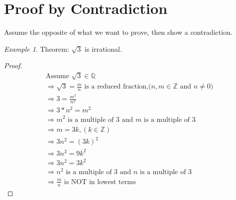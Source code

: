\documentclass[12pt]{article}
\theoremstyle{remark}
\newtheorem*{example}{Example}
\newcommand{\Z}{\mathbb{Z}}
\begin{document}
	\section{Proof by Contradiction}
	Assume the opposite of what we want to prove, then show a contradiction.
	\begin{example}
		Theorem: $\sqrt{3}$ is irrational.
		\begin{proof}
			\begin{gather}
				\text{Assume $\sqrt{3} \in \mathbb{Q}$} \\
				\Rightarrow \sqrt{3} = \frac{m}{n} \text{ is a reduced fraction,($n, m \in \mathbb{Z}$ and $n \neq 0$)}\\
				\Rightarrow 3 = \frac{m^2}{n^2}\\
				\Rightarrow 3*n^2 = m^2 \\
				\Rightarrow m^2 \text{ is a multiple of $3$ and $m$ is a multiple of $3$} \\
				\Rightarrow m = 3k, (k \in \Z) \\
				\Rightarrow 3n^2 = (3k)^2 \\
				\Rightarrow 3n^2 = 9k^2 \\
				\Rightarrow 3n^2 = 3k^2\\
				\Rightarrow n^2 \text{ is a multiple of $3$ and $n$ is a multiple of $3$}\\
				\Rightarrow \frac{m}{n} \text{ is NOT in lowest terms}
			\end{gather}
		\end{proof}
	\end{example}
	
	
\end{document}
